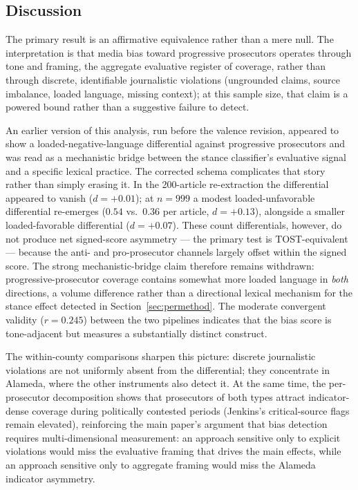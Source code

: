 \documentclass[12pt, letterpaper]{article}
\begin{document}
\begin{appendices}
\subsection*{Discussion}

The primary result is an affirmative equivalence rather than a mere null. The interpretation is that media bias toward progressive prosecutors operates through tone and framing, the aggregate evaluative register of coverage, rather than through discrete, identifiable journalistic violations (ungrounded claims, source imbalance, loaded language, missing context); at this sample size, that claim is a powered bound rather than a suggestive failure to detect.

An earlier version of this analysis, run before the valence revision, appeared to show a loaded-negative-language differential against progressive prosecutors and was read as a mechanistic bridge between the stance classifier's evaluative signal and a specific lexical practice. The corrected schema complicates that story rather than simply erasing it. In the 200-article re-extraction the differential appeared to vanish ($d = +0.01$); at $n = 999$ a modest loaded-unfavorable differential re-emerges ($0.54$ vs.\ $0.36$ per article, $d = +0.13$), alongside a smaller loaded-favorable differential ($d = +0.07$). These count differentials, however, do not produce net signed-score asymmetry --- the primary test is TOST-equivalent --- because the anti- and pro-prosecutor channels largely offset within the signed score. The strong mechanistic-bridge claim therefore remains withdrawn: progressive-prosecutor coverage contains somewhat more loaded language in \emph{both} directions, a volume difference rather than a directional lexical mechanism for the stance effect detected in Section~\ref{sec:permethod}. The moderate convergent validity ($r = 0.245$) between the two pipelines indicates that the bias score is tone-adjacent but measures a substantially distinct construct.

The within-county comparisons sharpen this picture: discrete journalistic violations are not uniformly absent from the differential; they concentrate in Alameda, where the other instruments also detect it. At the same time, the per-prosecutor decomposition shows that prosecutors of both types attract indicator-dense coverage during politically contested periods (Jenkins's critical-source flags remain elevated), reinforcing the main paper's argument that bias detection requires multi-dimensional measurement: an approach sensitive only to explicit violations would miss the evaluative framing that drives the main effects, while an approach sensitive only to aggregate framing would miss the Alameda indicator asymmetry.


\end{appendices}
\end{document}
